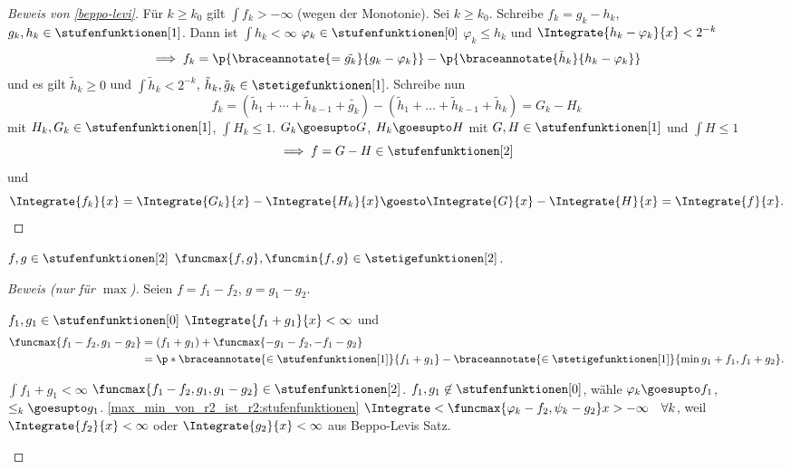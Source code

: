 \begin{proof}[Beweis von \ref{beppo-levi}]
  Für \( k\geq k_0 \) gilt \( \int f_k>-\infty \) (wegen der Monotonie). Sei \( k\geq k_0 \). Schreibe \( f_k=g_k-h_k \), \( g_k,h_k\in \stufenfunktionen[1] \). Dann ist \( \int h_k<\infty \) \timplies \texists \( \varphi_k\in \stufenfunktionen[0] \) \sd \( \varphi_k\leq h_k \) und \( \Integrate{h_k-\varphi_k}{x}<2^{-k} \)
  \begin{equation*}
    \implies f_k=\p{\braceannotate{=\tilde{g_k}}{g_k-\varphi_k}}-\p{\braceannotate{\tilde{h}_k}{h_k-\varphi_k}}
  \end{equation*}
  und es gilt \( \tilde{h}_k\geq 0 \) und \( \int \tilde{h}_k<2^{-k} \), \( \tilde{h}_k,\tilde{g}_k\in \stetigefunktionen[1] \).
  Schreibe nun
  \begin{equation*}
    f_k=(\tilde{h}_1+\dotsb+\tilde{h}_{k-1}+\tilde{g_k})-(\tilde{h}_1+\dotsc+\tilde{h}_{k-1}+\tilde{h}_k)=G_k-H_k
  \end{equation*}
  mit \( H_k,G_k\in \stufenfunktionen[1] \), \( \int H_k\leq 1 \).  \timplies \( G_k\goesupto G \), \( H_k\goesupto H \) mit \( G,H\in \stufenfunktionen[1] \) und \( \int H\leq 1 \)
  \begin{equation*}
    \implies f=G-H\in \stufenfunktionen[2]
  \end{equation*}
  und
  \begin{equation*}
    \Integrate{f_k}{x}=\Integrate{G_k}{x}-\Integrate{H_k}{x}\goesto \Integrate{G}{x}-\Integrate{H}{x}=\Integrate{f}{x}.
  \end{equation*}
\end{proof}
\begin{folgerung*}\label{max_min_von_r2_ist_r2}
  \( f,g\in \stufenfunktionen[2] \) \timplies \( \funcmax{f,g},\funcmin{f,g}\in \stetigefunktionen[2] \).
\end{folgerung*} 
\begin{proof}[Beweis (nur für \( \max \))]
  Seien \( f=f_1-f_2 \), \( g=g_1-g_2 \).
  \begin{eigenschaftenenumerate}
    \item\label{max_min_von_r2_ist_r2:stufenfunktionen} \( f_1,g_1\in \stufenfunktionen[0] \) \timplies \( \Integrate{f_1+g_1}{x}<\infty \) und 
    \begin{align*}
      \funcmax{f_1-f_2,g_1-g_2}&=(f_1+g_1)+\funcmax{-g_1-f_2,-f_1-g_2}\\
      &=\p*{\braceannotate{\in \stufenfunktionen[1]}{f_1+g_1}}-\braceannotate{\in \stetigefunktionen[1]}{\min{g_1+f_1,f_1+g_2}}.
    \end{align*}
    \item \( \int f_1+g_1<\infty \) \timplies \( \funcmax{f_1-f_2,g_1,g_1-g_2}\in \stufenfunktionen[2] \). \( f_1,g_1\not\in \stufenfunktionen[0] \), wähle \( \varphi_k\goesupto f_1 \), \( \leq_k\goesupto g_1 \).  \ref{max_min_von_r2_ist_r2:stufenfunktionen} \timplies \( \Integrate<{\funcmax{\varphi_k-f_2,\psi_k-g_2}}{x} >-\infty\quad \forall  k\), weil \( \Integrate{f_2}{x}<\infty \) oder \( \Integrate{g_2}{x}<\infty \) \timplies \Beh aus Beppo-Levis Satz.
  \end{eigenschaftenenumerate}
\end{proof}